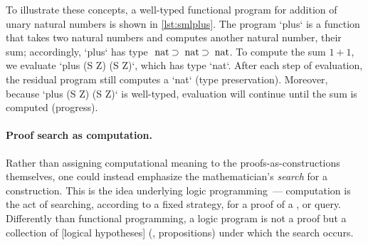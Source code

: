 To illustrate these concepts, a well-typed functional program for addition of unary natural numbers is shown in \cref{lst:smlplus}.
The program \sml`plus` is a function that takes two natural numbers and computes another natural number, their sum; accordingly, \sml`plus` has type $\text{\sml`nat`} \imp \text{\sml`nat`} \imp \text{\sml`nat`}$.
To compute the sum $1 + 1$, we evaluate \sml`plus (S Z) (S Z)`, which has type \sml`nat`.
After each step of evaluation, the residual program still computes a \sml`nat` (type preservation).
Moreover, because \sml`plus (S Z) (S Z)` is well-typed, evaluation will continue until the sum is computed (progress).




\paragraph*{Proof search as computation.}
Rather than assigning computational meaning to the proofs-as-constructions themselves, one could instead
emphasize the mathematician's \emph{search} for a construction.
This is the idea underlying logic programming~\autocites{Colmerauer+:73}{Kowalski:IFIP74}---%
computation is the act of searching, according to a fixed strategy, for a proof of a , or query.
Differently than functional programming, a logic program is not a proof but a collection of [logical hypotheses] (\ie, propositions) under which the search occurs.

